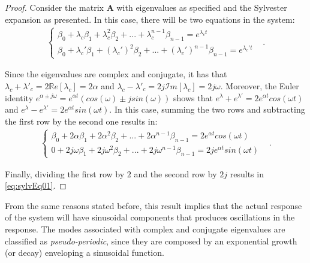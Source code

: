 \documentclass[a4paper,11pt]{book}
\numberwithin{figure}{chapter}
\numberwithin{equation}{chapter}
\numberwithin{table}{chapter}
\theoremstyle{definition}
\begin{document}
\begin{proof}
    Consider the matrix $\bm{A}$ with eigenvalues as specified and the Sylvester expansion as presented. In this case, there will be two equations in the system:
    \begin{align} 
    \begin{cases}
        \beta_0 + \lambda_c \beta_1 + \lambda_c^2  \beta_2 + ... + \lambda_c^{n-1} \beta_{n-1} = e^{\lambda_c t} & \\
        \beta_0 + \lambda_c' \beta_1 + (\lambda_c')^{2} \beta_2 + ... + (\lambda_c')^{n-1} \beta_{n-1} = e^{\lambda_c' t} &
    \end{cases}
    .\end{align}
    
    Since the eigenvalues are complex and conjugate, it has that $\lambda_c + \lambda'_c = 2 \mathbb{R}e[\lambda_c] = 2 \alpha$ and $\lambda_c - \lambda'_c = 2j \mathcal{I}m[\lambda_c] = 2j \omega$. Moreover, the Euler identity $e^{\alpha \pm j \omega} = e^{\alpha t}(cos(\omega) \pm j sin(\omega))$ shows that $e^{\lambda} + e^{\lambda'} = 2 e^{\alpha t} cos(\omega t)$ and $e^{\lambda} - e^{\lambda'} = 2 e^{\alpha t} sin(\omega t)$. In this case, summing the two rows and subtracting the first row by the second one results in:
    \begin{align} 
    \begin{cases}
        \beta_0 + 2 \alpha \beta_1 + 2 \alpha^2  \beta_2 + ... + 2 \alpha^{n-1} \beta_{n-1} = 2 e^{\alpha t} cos(\omega t) & \\
        0 + 2j \omega \beta_1 + 2j \omega^{2} \beta_2 + ... + 2j \omega^{n-1} \beta_{n-1} = 2j e^{\alpha t} sin(\omega t) &
    \end{cases}
    .\end{align}
    
    Finally, dividing the first row by $2$ and the second row by $2j$ results in \eqref{eq:sylvEq01}.
\end{proof}

From the same reasons stated before, this result implies that the actual response of the system will have sinusoidal components that produces oscillations in the response. The modes associated with complex and conjugate eigenvalues are classified as \textit{pseudo-periodic}, since they are composed by an exponential growth (or decay) enveloping a sinusoidal function. 
\end{document}
